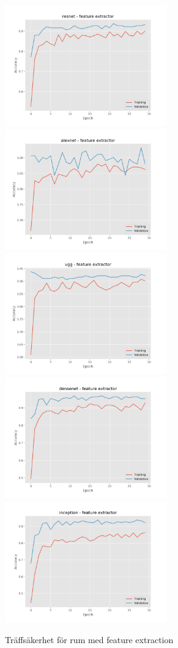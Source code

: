 \documentclass[]{kththesis}
\begin{document}
\begin{figure}[h]
  \includegraphics[width=7cm]{r_a_resnet_fe}
  \includegraphics[width=7cm]{r_a_alexnet_fe}
  \includegraphics[width=7cm]{r_a_vgg_fe}
  \includegraphics[width=7cm]{r_a_densenet_fe}
  \includegraphics[width=7cm]{r_a_inception_fe}
  \caption{Träffsäkerhet för rum med feature extraction}
  \label{fig:r_a_1}
\end{figure}
\end{document}

